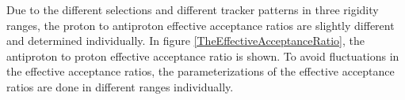 Due to the different selections and different tracker patterns in three rigidity ranges, the proton to antiproton effective acceptance ratios are slightly different and determined individually. In figure \ref{TheEffectiveAcceptanceRatio}, the antiproton to proton effective acceptance ratio is shown. To avoid fluctuations in the effective acceptance ratios, the parameterizations of the effective acceptance ratios are done in different ranges individually.







